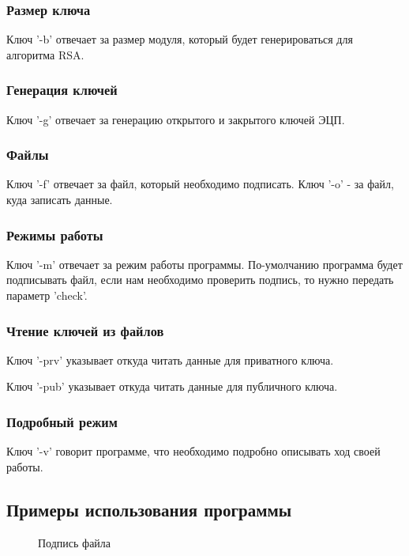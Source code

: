 \subsubsection{Размер ключа}
Ключ '-b' отвечает за размер модуля, который будет генерироваться для алгоритма RSA.

\subsubsection{Генерация ключей}
Ключ '-g' отвечает за генерацию открытого и закрытого ключей ЭЦП.

\subsubsection{Файлы}
Ключ '-f' отвечает за файл, который необходимо подписать. Ключ '-o' - за файл, куда записать данные.

\subsubsection{Режимы работы}
Ключ '-m' отвечает за режим работы программы. По-умолчанию программа будет подписывать файл, если нам необходимо проверить подпись, то нужно передать параметр 'check'.

\subsubsection{Чтение ключей из файлов}
Ключ '-prv' указывает откуда читать данные для приватного ключа.

Ключ '-pub' указывает откуда читать данные для публичного ключа.

\subsubsection{Подробный режим}
Ключ '-v' говорит программе, что необходимо подробно описывать ход своей работы.

\newpage
\subsection{Примеры использования программы}

\begin{figure}[h!]
  \caption{Подпись файла}
\end{figure}

